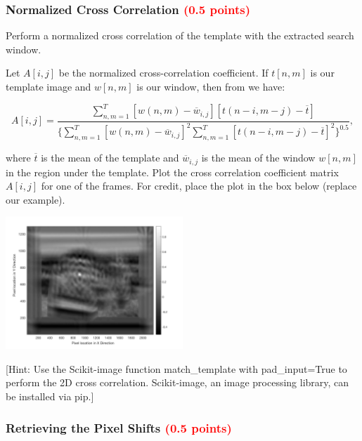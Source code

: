 \documentclass[answers]{exam}
\newcommand{\mypoints}[1]{\textcolor{red}{(#1 points)}}
\newcommand{\myinput}[1]{\textcolor{blue}{#1}}
\begin{document}
\subsubsection{Normalized Cross Correlation \mypoints{0.5} }\label{sssec:normcorr}



Perform a normalized cross correlation of the template with the extracted search window.


Let $A[i,j]$ be the normalized cross-correlation coefficient. If $t[n,m]$ is our template image and $w[n,m]$ is our window, then from \cite{Lewis95fastnormalized} we have:

\begin{equation}
A[i,j] = \frac{\sum_{n,m=1}^T [w(n,m) - \overline{w}_{i,j}] [t(n-i, m-j) - \overline{t } ]}{ \{\sum_{n,m=1}^T [w(n,m) - \overline{w}_{i,j}]^2 \sum_{n,m=1}^T [t(n-i, m-j) - \overline{t } ]^2 \}^{0.5}},
\end{equation}

where $\overline{t}$ is the mean of the template and $\overline{w}_{i,j}$ is the mean of the window $w[n,m]$ in the region under the template. Plot the cross correlation coefficient matrix $A[i,j]$ for one of the frames. For credit, place the plot in the box below (replace our example).


\begin{solution}
\centering 
  \includegraphics[width=0.5\textwidth]{pset_normcorr.png}
  \captionof{figure}{\myinput{Insert the plot of the correlation coefficient Matrix (replace our example).}}
\end{solution}


[Hint: Use the Scikit-image function match\_template with pad\_input=True to perform the 2D cross correlation. Scikit-image, an image processing library, can be installed via pip.]

\subsubsection{Retrieving the Pixel Shifts \mypoints{0.5} }\label{sssec:pixshift}
\end{document}
